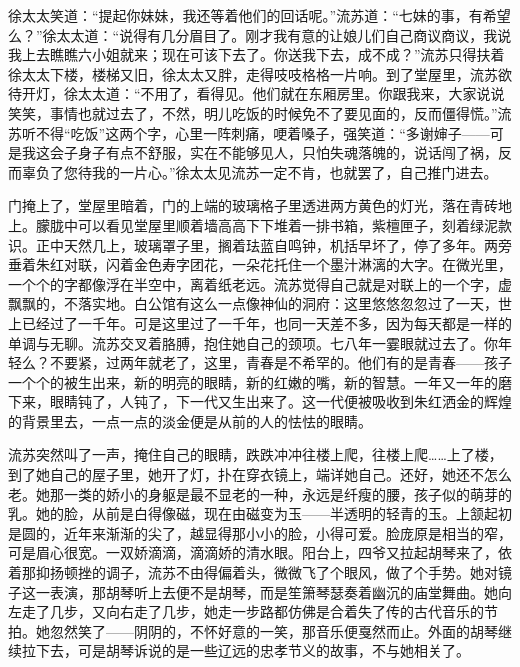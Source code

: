 \par 徐太太笑道：“提起你妹妹，我还等着他们的回话呢。”流苏道：“七妹的事，有希望么？”徐太太道：“说得有几分眉目了。刚才我有意的让娘儿们自己商议商议，我说我上去瞧瞧六小姐就来；现在可该下去了。你送我下去，成不成？”流苏只得扶着徐太太下楼，楼梯又旧，徐太太又胖，走得吱吱格格一片响。到了堂屋里，流苏欲待开灯，徐太太道：“不用了，看得见。他们就在东厢房里。你跟我来，大家说说笑笑，事情也就过去了，不然，明儿吃饭的时候免不了要见面的，反而僵得慌。”流苏听不得“吃饭”这两个字，心里一阵刺痛，哽着嗓子，强笑道：“多谢婶子——可是我这会子身子有点不舒服，实在不能够见人，只怕失魂落魄的，说话闯了祸，反而辜负了您待我的一片心。”徐太太见流苏一定不肯，也就罢了，自己推门进去。
\par 门掩上了，堂屋里暗着，门的上端的玻璃格子里透进两方黄色的灯光，落在青砖地上。朦胧中可以看见堂屋里顺着墙高高下下堆着一排书箱，紫檀匣子，刻着绿泥款识。正中天然几上，玻璃罩子里，搁着珐蓝自鸣钟，机括早坏了，停了多年。两旁垂着朱红对联，闪着金色寿字团花，一朵花托住一个墨汁淋漓的大字。在微光里，一个个的字都像浮在半空中，离着纸老远。流苏觉得自己就是对联上的一个字，虚飘飘的，不落实地。白公馆有这么一点像神仙的洞府：这里悠悠忽忽过了一天，世上已经过了一千年。可是这里过了一千年，也同一天差不多，因为每天都是一样的单调与无聊。流苏交叉着胳膊，抱住她自己的颈项。七八年一霎眼就过去了。你年轻么？不要紧，过两年就老了，这里，青春是不希罕的。他们有的是青春——孩子一个个的被生出来，新的明亮的眼睛，新的红嫩的嘴，新的智慧。一年又一年的磨下来，眼睛钝了，人钝了，下一代又生出来了。这一代便被吸收到朱红洒金的辉煌的背景里去，一点一点的淡金便是从前的人的怯怯的眼睛。
\par 流苏突然叫了一声，掩住自己的眼睛，跌跌冲冲往楼上爬，往楼上爬……上了楼，到了她自己的屋子里，她开了灯，扑在穿衣镜上，端详她自己。还好，她还不怎么老。她那一类的娇小的身躯是最不显老的一种，永远是纤瘦的腰，孩子似的萌芽的乳。她的脸，从前是白得像磁，现在由磁变为玉——半透明的轻青的玉。上颔起初是圆的，近年来渐渐的尖了，越显得那小小的脸，小得可爱。脸庞原是相当的窄，可是眉心很宽。一双娇滴滴，滴滴娇的清水眼。阳台上，四爷又拉起胡琴来了，依着那抑扬顿挫的调子，流苏不由得偏着头，微微飞了个眼风，做了个手势。她对镜子这一表演，那胡琴听上去便不是胡琴，而是笙箫琴瑟奏着幽沉的庙堂舞曲。她向左走了几步，又向右走了几步，她走一步路都仿佛是合着失了传的古代音乐的节拍。她忽然笑了——阴阴的，不怀好意的一笑，那音乐便戛然而止。外面的胡琴继续拉下去，可是胡琴诉说的是一些辽远的忠孝节义的故事，不与她相关了。
